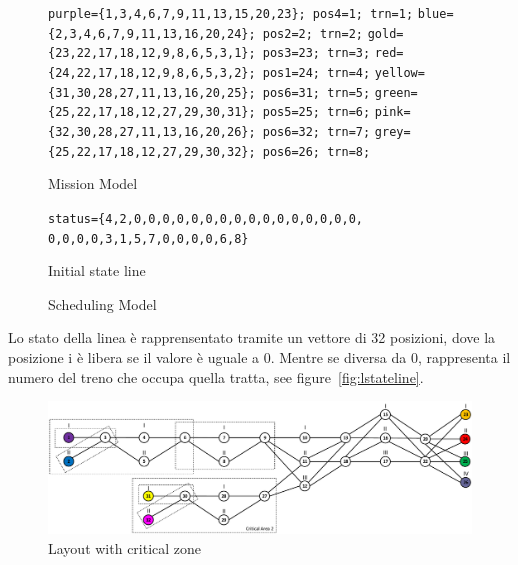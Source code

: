 \documentclass{ewic}
\makeatletter
\newenvironment{SubFloat}[2][]%
			{\def\sf@one{#1}%
			\def\sf@two{#2}%
			\setbox\sf@box\hbox
			\bgroup}%
			{ \egroup
			\ifx\@empty\sf@two\@empty\relax
			\def\sf@two{\@empty}
			\fi
			\ifx\@empty\sf@one\@empty\relax
			\subfloat[\sf@two]{\box\sf@box}%
			\else
			\subfloat[\sf@one][\sf@two]{\box\sf@box}%
			\fi}
\makeatother
\begin{document}
			\begin{figure}[!htp]
			 \centering
			  \begin{SubFloat}{\label{fig:lmissionm}Mission Model}
			\begin{footnotesize}
			  \begin{minipage}{2.9in} 
			\centering
			\verb+purple={1,3,4,6,7,9,11,13,15,20,23}; pos4=1; trn=1;+
			\verb+blue={2,3,4,6,7,9,11,13,16,20,24}; pos2=2; trn=2;+
			\verb+gold={23,22,17,18,12,9,8,6,5,3,1}; pos3=23; trn=3;+
			\verb+red={24,22,17,18,12,9,8,6,5,3,2}; pos1=24; trn=4;+
			\verb+yellow={31,30,28,27,11,13,16,20,25}; pos6=31; trn=5;+
			\verb+green={25,22,17,18,12,27,29,30,31}; pos5=25; trn=6;+
			\verb+pink={32,30,28,27,11,13,16,20,26}; pos6=32; trn=7;+
			\verb+grey={25,22,17,18,12,27,29,30,32}; pos6=26; trn=8;+
			\end{minipage}%
			  \end{footnotesize}  
			\end{SubFloat}
			 \begin{SubFloat}{Initial state line\label{fig:lstateline}}
			 \begin{footnotesize}
			   \begin{minipage}{2.9in}\centering
			\verb+status={4,2,0,0,0,0,0,0,0,0,0,0,0,0,0,0,0,0,+
			\verb+0,0,0,0,3,1,5,7,0,0,0,0,6,8}+
			\end{minipage}%
			\end{footnotesize}
			\end{SubFloat}
			
			\caption{Scheduling Model}
			 \label{fig:SchedulingModel}
			 \end{figure}
			
			
			Lo stato della linea è rapprensentato tramite un vettore di 32 posizioni, dove la posizione i è libera se il valore è uguale a 0. Mentre se diversa da 0, rappresenta il numero del treno che occupa quella tratta, see figure~\ref{fig:lstateline}.
	
			
			
			
			\begin{figure}[htp]
				\begin{centering}	
				\includegraphics[scale=0.5]{img/esempiozone}
				\caption{Layout with critical zone}
				\label{fig:examplezone}
				\end{centering}
			\end{figure}
			
\end{document}
